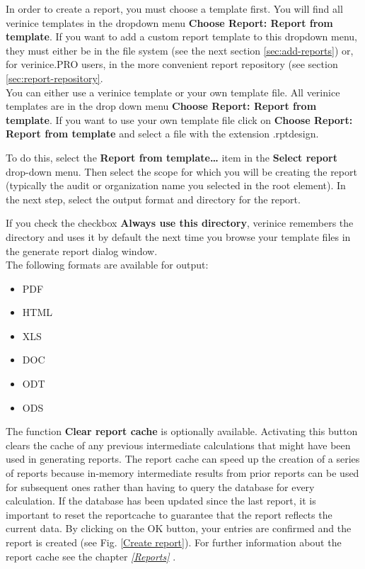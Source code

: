 \documentclass[a4paper,10pt]{book}
\begin{document}
In order to create a report, you must choose a template first. 
You will find all verinice templates in the dropdown menu \textbf{Choose Report:
Report from template}. If you want to add a custom report template to this dropdown menu, they must either be in
the file system (see the next section \ref{sec:add-reports}) or, for
verinice.PRO users, in the more convenient report repository (see
section \ref{sec:report-repository}.\\

You can either use a verinice template or your own template file. All verinice templates are in the drop down menu \textbf{Choose Report: Report from template}.
If you want to use your own template file click on \textbf{Choose Report: Report from template} and select a file with the extension .rptdesign.

To do this, select the \textbf{Report from template\ldots}
item in the \textbf{Select report} drop-down menu. Then select the scope for which you will be creating the report
(typically the audit or organization name you selected in the root element). In the next step, select the output format and
directory for the report.

If you check the checkbox \textbf{Always use this directory}, verinice remembers the directory and uses it by default the next
time you browse your template files in the generate report dialog window.
\newline\\
The following formats are available for output:
\begin{itemize}
 \item \textsc{PDF}
 \item \textsc{HTML}
 \item \textsc{XLS}
 \item \textsc{DOC}
 \item \textsc{ODT}
 \item \textsc{ODS}
\end{itemize}
The function \textbf{Clear report cache} is optionally available.
Activating this button clears the cache of any previous intermediate calculations that might have been used in generating reports.
The report cache can speed up the creation of a series of reports because in-memory intermediate results from prior reports can be
used for subsequent ones rather than having to query the database for every calculation. If the database has been updated since the
last report, it is important to reset the reportcache to guarantee that the report reflects the current data.
\newline
By clicking on the OK button, your entries are confirmed and the report is created (see Fig. \ref{Create report}).
\newline
For further information about the report cache see the chapter {\em \ref{Reports} }.
\end{document}
